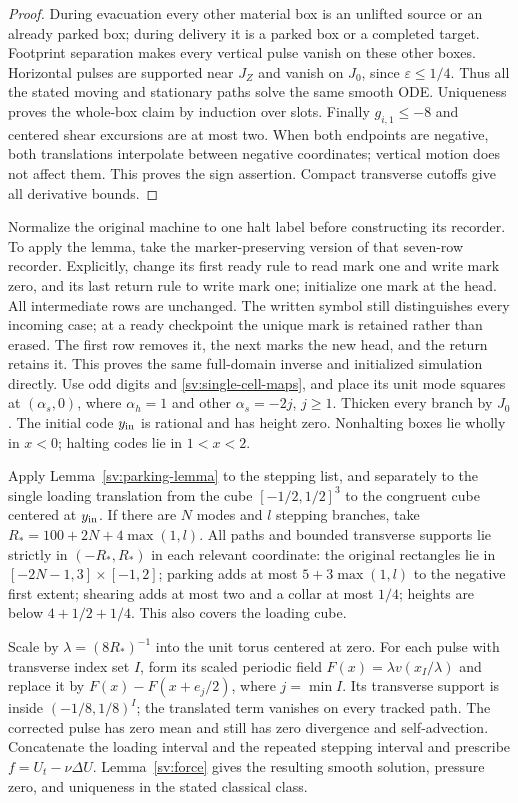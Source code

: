 \begin{proof}
During evacuation every other material box is an unlifted source or an
already parked box; during delivery it is a parked box or a completed
target.  Footprint separation makes every vertical pulse vanish on
these other boxes.  Horizontal pulses are supported near $J_Z$ and
vanish on $J_0$, since $\varepsilon\le1/4$.
Thus all the stated moving and stationary paths solve the same smooth
ODE.  Uniqueness proves the whole-box claim by induction over slots.
Finally $g_{i,1}\le-8$ and centered shear excursions are at most two.
When both endpoints are negative, both translations interpolate between
negative coordinates; vertical motion does not affect them.  This proves
the sign assertion.  Compact transverse cutoffs give all derivative bounds.
\end{proof}

Normalize the original machine to one halt label before constructing
its recorder. To apply the lemma, take the marker-preserving version
of that seven-row recorder.  Explicitly, change its first ready rule to read mark one and
write mark zero, and its last return rule to write mark one; initialize
one mark at the head.  All intermediate rows are unchanged.  The written
symbol still distinguishes every incoming case; at a ready checkpoint the
unique mark is retained rather than erased.  The first row removes it,
the next marks the new head, and the return retains it.  This proves the
same full-domain inverse and initialized simulation directly.  Use odd digits and \eqref{sv:single-cell-maps},
and place its unit mode squares at $(\alpha_s,0)$, where
$\alpha_h=1$ and other $\alpha_s=-2j$, $j\ge1$.
Thicken every branch by $J_0$.  The initial code $y_{\rm in}$ is
rational and has height zero.  Nonhalting boxes lie wholly in $x<0$;
halting codes lie in $1<x<2$.

Apply Lemma~\ref{sv:parking-lemma} to the stepping list, and separately
to the single loading translation from the cube $[-1/2,1/2]^3$
to the congruent cube centered at $y_{\rm in}$.  If there are $N$
modes and $l$ stepping branches, take
$R_*=100+2N+4\max(1,l)$.  All paths and bounded transverse
supports lie strictly in $(-R_*,R_*)$ in each relevant coordinate:
the original rectangles lie in $[-2N-1,3]\times[-1,2]$;
parking adds at most $5+3\max(1,l)$ to the negative first extent;
shearing adds at most two and a collar at most $1/4$; heights are
below $4+1/2+1/4$.  This also covers the loading cube.

Scale by $\lambda=(8R_*)^{-1}$ into the unit torus centered at
zero.  For each pulse with transverse index set $I$, form its scaled
periodic field $F(x)=\lambda v(x_I/\lambda)$ and replace it by
$F(x)-F(x+e_j/2)$, where $j=\min I$.  Its transverse support
is inside $(-1/8,1/8)^I$; the translated term vanishes on every
tracked path.  The corrected pulse has zero mean and still has zero
divergence and self-advection.  Concatenate the loading interval and
the repeated stepping interval and prescribe $f=U_t-\nu\Delta U$.
Lemma~\ref{sv:force} gives the resulting smooth solution, pressure
zero, and uniqueness in the stated classical class.

